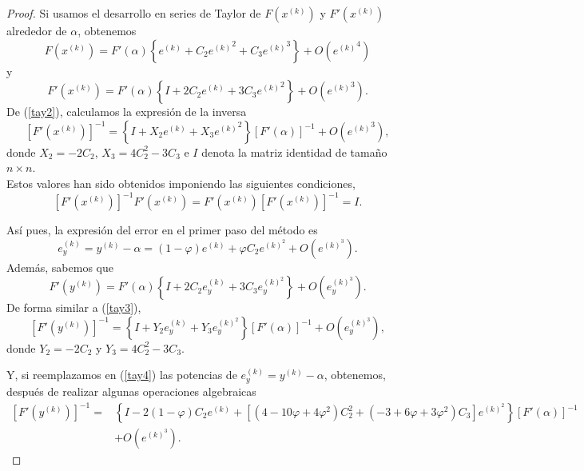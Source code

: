 \begin{proof}
	Si usamos el desarrollo en series de Taylor de $F\left(x^{(k)}\right)$ y $F'\left(x^{(k)}\right)$ alrededor de $\alpha$, obtenemos	
	\begin{equation*} \label{tay1}
	F\left( x^{(k)} \right)=F'(\alpha)\left\{ e^{(k)}+C_2{e^{(k)}}^2+C_3{e^{(k)}}^3 \right\}+O({e^{(k)}}^4)
	\end{equation*}
	y
	\begin{equation}\label{tay2}
	F'\left( x^{(k)} \right)=F'(\alpha)\left\{ I+2C_2e^{(k)}+3C_3{e^{(k)}}^2 \right\}+O({e^{(k)}}^3).
	\end{equation}
	De  (\ref{tay2}), calculamos la expresión de la inversa
	\begin{equation} \label{tay3}
	\left[ F'\left(x^{(k)}\right)\right]^{-1}=\left\{I+X_2e^{(k)}+X_3{e^{(k)}}^2 \right\}\left[F'(\alpha)\right]^{-1}+O({e^{(k)}}^3),
	\end{equation}
	donde $X_2=-2C_2$, $X_3=4C_2^2-3C_3$ e $I$ denota la matriz identidad de tamaño $n \times n$.\\
	Estos valores han sido obtenidos imponiendo las siguientes condiciones,
	\[
	\left[ 	F'\left(x^{(k)}\right) \right]^{-1}F'\left(x^{(k)}\right)=F'\left(x^{(k)}\right)\left[
	F'\left(x^{(k)}\right)   \right]^{-1}=I.
	\]
	
	Así pues, la expresión del error en el primer paso del método es
	\begin{equation*}
	e_y^{(k)}=y^{(k)}-\alpha  = (1-\varphi)e^{(k)}+\varphi C_2e^{(k)^2}+O(e^{(k)^3}).
	\end{equation*}
	Además, sabemos que
	\begin{equation} \label{tayFsistemas}
	F'\left(y^{(k)}\right) = F'(\alpha)\left\{I+2C_2e_y^{(k)}+3C_3e_y^{(k)^2}\right\}+O(e_y^{(k)^3}).
	\end{equation}
	De forma similar a (\ref{tay3}),
	\begin{equation} \label{tay4}
	\left[F'\left(y^{(k)}\right)\right]^{-1}=\left\{I+Y_2e_y^{(k)}+Y_3e_y^{(k)^2}\right\}\left[F'(\alpha)\right]^{-1}+O(e_y^{(k)^3}),
	\end{equation}
	donde $Y_2=-2C_2$ y $Y_3=4C_2^2-3C_3$.
	
	Y, si reemplazamos en (\ref{tay4}) las potencias de $e_y^{(k)}=y^{(k)}-\alpha$, obtenemos, después de realizar algunas operaciones algebraicas
	\begin{align} \label{tay5}
	\left[F'\left(y^{(k)}\right)\right]^{-1} \nonumber = & \left\{I-2(1-\varphi)C_2e^{(k)}+\left[(4-10\varphi+4\varphi^2)C_2^2+(-3+6\varphi+3\varphi^2)C_3\right]e^{(k)^2}\right\}\left[F'(\alpha)\right]^{-1}\\
	& +O(e^{(k)^3}).
	\end{align}
	

\end{proof}
